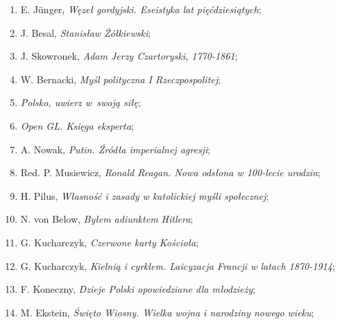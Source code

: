 \documentclass[a4paper,11pt]{article}
\begin{document}
\begin{enumerate}
\item E. J\"{u}nger, \textit{Węzeł gordyjski. Eseistyka lat
    pięćdziesiątych};



\item J. Besal, \textit{Stanisław Żółkiewski};



\item J. Skowronek, \textit{Adam Jerzy Czartoryski, 1770-1861};



\item W. Bernacki, \textit{Myśl polityczna I Rzeczpospolitej};



\item \textit{Polsko, uwierz w~swoją siłę};



\item \textit{Open GL. Księga eksperta};



\item A. Nowak, \textit{Putin. Źródła imperialnej agresji};



\item Red. P. Musiewicz, \textit{Ronald Reagan. Nowa odsłona w 100-lecie
    urodzin};



\item H. Pilus, \textit{Własność i zasady w katolickiej myśli
    społecznej};



\item N. von Below, \textit{Byłem adiunktem Hitlera};



\item G. Kucharczyk, \textit{Czerwone karty Kościoła};



\item G. Kucharczyk, \textit{Kielnią i cyrklem. Laicyzacja Francji w
    latach 1870-1914};



\item F. Koneczny, \textit{Dzieje Polski opowiedziane dla młodzieży};



\item M. Ekstein, \textit{Święto Wiosny. Wielka wojna i narodziny nowego
    wieku};




\end{enumerate}
\end{document}
